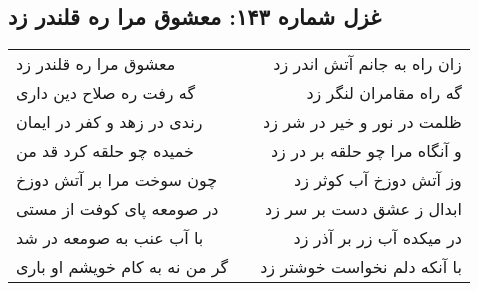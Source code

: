 \begin{center}
\section*{غزل شماره ۱۴۳: معشوق مرا ره قلندر زد}
\label{sec:143}
\begin{longtable}{l p{0.5cm} r}
معشوق مرا ره قلندر زد
&&
زان راه به جانم آتش اندر زد
\\
گه رفت ره صلاح دین داری
&&
گه راه مقامران لنگر زد
\\
رندی در زهد و کفر در ایمان
&&
ظلمت در نور و خیر در شر زد
\\
خمیده چو حلقه کرد قد من
&&
و آنگاه مرا چو حلقه بر در زد
\\
چون سوخت مرا بر آتش دوزخ
&&
وز آتش دوزخ آب کوثر زد
\\
در صومعه پای کوفت از مستی
&&
ابدال ز عشق دست بر سر زد
\\
با آب عنب به صومعه در شد
&&
در میکده آب زر بر آذر زد
\\
گر من نه به کام خویشم او باری
&&
با آنکه دلم نخواست خوشتر زد
\\
\end{longtable}
\end{center}
